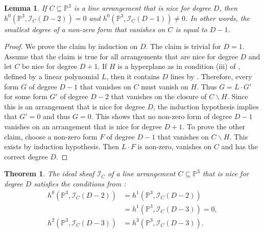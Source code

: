 \documentclass[a4paper,10pt]{amsart}
\theoremstyle{definition}
\theoremstyle{plain}
\newtheorem{thm}[Def]{Theorem}
\newtheorem{lem}[Def]{Lemma}
\newcommand{\cI}{{\mathcal I}}
\newcommand{\pp}{\mathbb{P}}
\begin{document}
\begin{lem}\label{lem:smallestform}
    If $C\subseteq\pp^3$ is a line arrangement that is nice for degree $D$, then $h^0(\pp^3,\cI_C(D-2))=0$ and $h^0(\pp^3,\cI_C(D-1))\neq0$. In other words, the smallest degree of a non-zero form that vanishes on $C$ is equal to $D-1$.
\end{lem}

\begin{proof}
    We prove the claim by induction on $D$. The claim is trivial for $D=1$. Assume that the claim is true for all arrangements that are nice for degree $D$ and let $C$ be nice for degree $D+1$. If $H$ is a hyperplane as in condition (iii) of , defined by a linear polynomial $L$, then it contains $D$ lines by . Therefore, every form $G$ of degree $D-1$ that vanishes on $C$ must vanish on $H$. Thus $G=L\cdot G'$ for some form $G'$ of degree $D-2$ that vanishes on the closure of $C\smallsetminus H$. Since this is an arrangement that is nice for degree $D$, the induction hypothesis implies that $G'=0$ and thus $G=0$. This shows that no non-zero form of degree $D-1$ vanishes on an arrangement that is nice for degree $D+1$. To prove the other claim, choose a non-zero form $F$ of degree $D-1$ that vanishes on $C\smallsetminus H$. This exists by induction hypothesis. Then $L\cdot F$ is non-zero, vanishes on $C$ and has the correct degree $D$.
\end{proof}

\begin{thm}\label{thm:nicearrangementsdetrep}
    The ideal sheaf $\cI_C$ of  a line arrangement $C\subseteq\pp^3$ that is nice for degree $D$ satisfies the conditions from :
    \begin{align*}
        h^0(\pp^3,\cI_C(D-2))&=h^1(\pp^3,\cI_C(D-2))\\
        &=h^1(\pp^3,\cI_C(D-3))=0,\\
        h^2(\pp^3,\cI_C(D-3))&=h^3(\pp^3,\cI_C(D-3)).
    \end{align*}
\end{thm}
\end{document}
